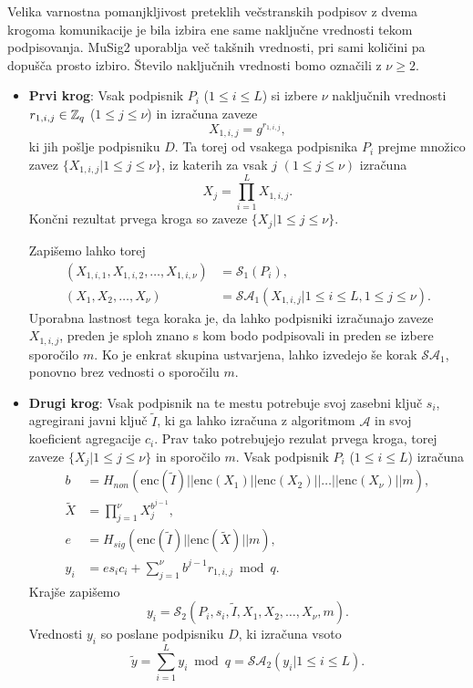 Velika varnostna pomanjkljivost preteklih večstranskih podpisov z dvema krogoma komunikacije je bila
izbira ene same naključne vrednosti tekom podpisovanja. MuSig2 uporablja več takšnih vrednosti, pri
sami količini pa dopušča prosto izbiro. Število naključnih vrednosti bomo označili z $\nu \geq 2$.
\begin{itemize}
    \item \textbf{Prvi krog}:
        Vsak podpisnik $P_i$ ($1 \le i \le L$) si izbere $\nu$ naključnih
        vrednosti $r_{1, i, j} \in \mathbb Z_q$ ($1 \le j \le \nu$) in izračuna zaveze
        $$
        X_{1, i, j} = g^{r_{1, i, j}},
        $$
        ki jih pošlje podpisniku $D$. Ta torej od vsakega podpisnika $P_i$ prejme množico zavez
        $\{X_{1, i, j} | 1 \le j \le \nu\}$, iz katerih za vsak $j$ $(1 \le j \le \nu)$ izračuna
        $$
        X_j = \prod_{i=1}^L X_{1, i, j}.
        $$
        Končni rezultat prvega kroga so zaveze $\{X_j | 1 \le j \le \nu\}$.

        Zapišemo lahko torej
        \begin{align*}
            (X_{1, i, 1}, X_{1, i, 2}, \dots, X_{1, i, \nu}) &= \mathcal{S}_1(P_i), \\
            (X_1, X_2, \dots, X_\nu) &= \mathcal{S}\mathcal{A}_1(X_{1, i, j} | 1 \le i \le L, 1 \le j \le \nu).
        \end{align*}
        Uporabna lastnost tega koraka je, da lahko podpisniki izračunajo zaveze $X_{1, i, j}$, preden je
        sploh znano s kom bodo podpisovali in preden se izbere sporočilo $m$. Ko je enkrat skupina
        ustvarjena, lahko izvedejo še korak $\mathcal{S}\mathcal{A}_1$, ponovno brez vednosti o
        sporočilu $m$.

    \item \textbf{Drugi krog}:
        Vsak podpisnik na te mestu potrebuje svoj zasebni ključ $s_i$, agregirani javni ključ
        $\tilde{I}$, ki ga lahko izračuna z algoritmom $\mathcal{A}$ in svoj koeficient agregacije
        $c_i$. Prav tako potrebujejo rezulat prvega kroga, torej zaveze $\{X_j | 1 \le j \le \nu\}$
        in sporočilo $m$. Vsak podpisnik $P_i$ ($1 \le i \le L$) izračuna
        \begin{align*}
            b &= H_{non}(\text{enc}(\tilde{I}) || \text{enc}(X_1) || \text{enc}(X_2) || \dots || \text{enc}(X_\nu) || m), \\
            \tilde{X} &= \prod_{j=1}^\nu X_j^{b^{j-1}}, \\
            e &= H_{sig}(\text{enc}(\tilde{I}) || \text{enc}(\tilde{X}) || m), \\
            y_i &= e s_i c_i + \sum_{j=1}^\nu b^{j-1} r_{1, i, j} \bmod q.
        \end{align*}
        Krajše zapišemo
        $$
        y_i = \mathcal{S}_2(P_i, s_i, \tilde{I}, X_1, X_2, \dots, X_\nu, m).
        $$
        Vrednosti $y_i$ so poslane podpisniku $D$, ki izračuna vsoto
        $$
        \tilde{y} = \sum_{i=1}^L y_i \bmod q = \mathcal{S}\mathcal{A}_2(y_i | 1 \le i \le L).
        $$


\end{itemize}
